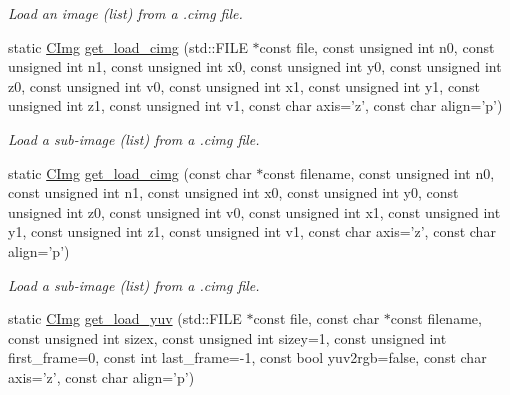 \begin{DoxyCompactItemize}
\begin{DoxyCompactList}\small\item\em Load an image (list) from a .cimg file. \end{DoxyCompactList}\item 
\hypertarget{structcimg__library_1_1_c_img_a978b5e9fee6fd1b1c362ce9e1480f038}{static \hyperlink{structcimg__library_1_1_c_img}{C\-Img} \hyperlink{structcimg__library_1_1_c_img_a978b5e9fee6fd1b1c362ce9e1480f038}{get\-\_\-load\-\_\-cimg} (std\-::\-F\-I\-L\-E $\ast$const file, const unsigned int n0, const unsigned int n1, const unsigned int x0, const unsigned int y0, const unsigned int z0, const unsigned int v0, const unsigned int x1, const unsigned int y1, const unsigned int z1, const unsigned int v1, const char axis='z', const char align='p')}\label{structcimg__library_1_1_c_img_a978b5e9fee6fd1b1c362ce9e1480f038}

\begin{DoxyCompactList}\small\item\em Load a sub-\/image (list) from a .cimg file. \end{DoxyCompactList}\item 
\hypertarget{structcimg__library_1_1_c_img_a6f336c422b364f804428fbdcff8a13d5}{static \hyperlink{structcimg__library_1_1_c_img}{C\-Img} \hyperlink{structcimg__library_1_1_c_img_a6f336c422b364f804428fbdcff8a13d5}{get\-\_\-load\-\_\-cimg} (const char $\ast$const filename, const unsigned int n0, const unsigned int n1, const unsigned int x0, const unsigned int y0, const unsigned int z0, const unsigned int v0, const unsigned int x1, const unsigned int y1, const unsigned int z1, const unsigned int v1, const char axis='z', const char align='p')}\label{structcimg__library_1_1_c_img_a6f336c422b364f804428fbdcff8a13d5}

\begin{DoxyCompactList}\small\item\em Load a sub-\/image (list) from a .cimg file. \end{DoxyCompactList}\item 
\hypertarget{structcimg__library_1_1_c_img_a5aa2bcea88874a087400e1588271d2cf}{static \hyperlink{structcimg__library_1_1_c_img}{C\-Img} \hyperlink{structcimg__library_1_1_c_img_a5aa2bcea88874a087400e1588271d2cf}{get\-\_\-load\-\_\-yuv} (std\-::\-F\-I\-L\-E $\ast$const file, const char $\ast$const filename, const unsigned int sizex, const unsigned int sizey=1, const unsigned int first\-\_\-frame=0, const int last\-\_\-frame=-\/1, const bool yuv2rgb=false, const char axis='z', const char align='p')}\label{structcimg__library_1_1_c_img_a5aa2bcea88874a087400e1588271d2cf}


\end{DoxyCompactItemize}
